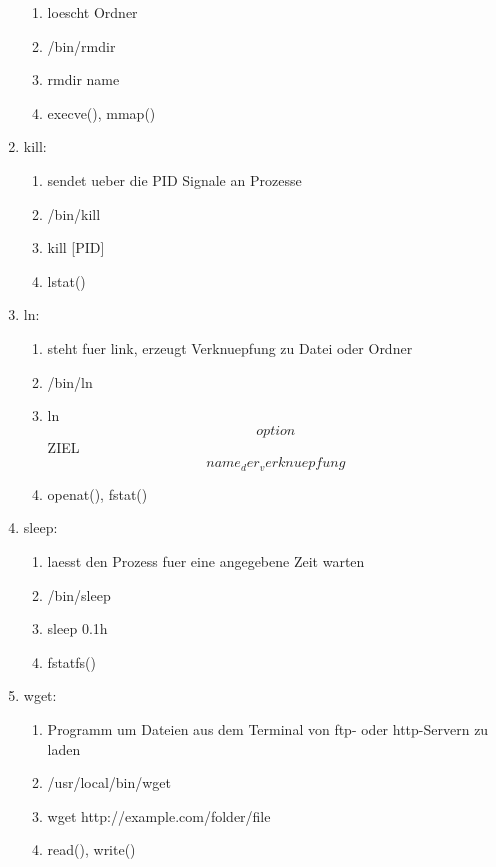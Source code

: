 \documentclass[11pt,a4paper,ngerman]{article}
\begin{document}
\begin{enumerate}
\begin{enumerate}
		\item loescht Ordner
		\item /bin/rmdir
		\item rmdir name
		\item execve(), mmap()
	\end{enumerate}
\item kill:
	\begin{enumerate}
		\item sendet ueber die PID Signale an Prozesse
		\item /bin/kill
		\item kill [PID]
		\item lstat()
	\end{enumerate}
\item ln:
	\begin{enumerate}
		\item steht fuer link, erzeugt Verknuepfung zu Datei oder Ordner
		\item /bin/ln
		\item ln \[option\] ZIEL \[name_der_verknuepfung\]
		\item openat(), fstat()
	\end{enumerate}
\item sleep:
	\begin{enumerate}
		\item laesst den Prozess fuer eine angegebene Zeit warten
		\item /bin/sleep
		\item sleep 0.1h
		\item fstatfs()
	\end{enumerate}
\item wget:
	\begin{enumerate}
		\item Programm um Dateien aus dem Terminal von ftp- oder http-Servern zu laden
		\item /usr/local/bin/wget
		\item wget http://example.com/folder/file
		\item read(), write()
	\end{enumerate}
\end{enumerate}
\end{document}
